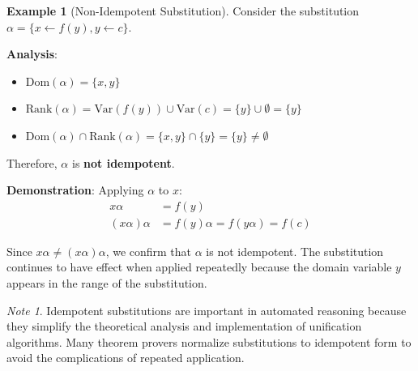 \documentclass[11pt,a4paper]{article}
\theoremstyle{definition}
\newtheorem{example}{Example}[section]
\theoremstyle{plain}
\theoremstyle{remark}
\newtheorem*{remark}{Note}
\begin{document}
\begin{example}[Non-Idempotent Substitution]
Consider the substitution $\alpha = \{x \leftarrow f(y), y \leftarrow c\}$.

\textbf{Analysis}:
\begin{itemize}
    \item $\text{Dom}(\alpha) = \{x, y\}$
    \item $\text{Rank}(\alpha) = \text{Var}(f(y)) \cup \text{Var}(c) = \{y\} \cup \emptyset = \{y\}$
    \item $\text{Dom}(\alpha) \cap \text{Rank}(\alpha) = \{x, y\} \cap \{y\} = \{y\} \neq \emptyset$
\end{itemize}

Therefore, $\alpha$ is \textbf{not idempotent}.

\textbf{Demonstration}: Applying $\alpha$ to $x$:
\begin{align*}
x\alpha &= f(y) \\
(x\alpha)\alpha &= f(y)\alpha = f(y\alpha) = f(c)
\end{align*}

Since $x\alpha \neq (x\alpha)\alpha$, we confirm that $\alpha$ is not idempotent. The substitution continues to have effect when applied repeatedly because the domain variable $y$ appears in the range of the substitution.
\end{example}

\begin{remark}
Idempotent substitutions are important in automated reasoning because they simplify the theoretical analysis and implementation of unification algorithms. Many theorem provers normalize substitutions to idempotent form to avoid the complications of repeated application.
\end{remark}
\end{document}
